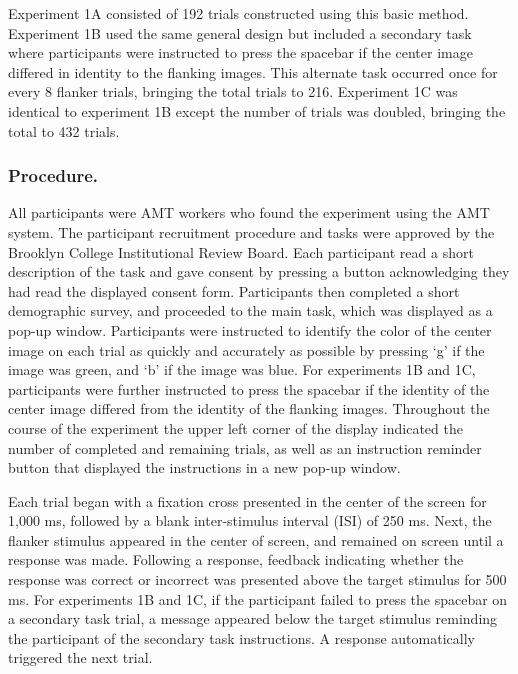 \documentclass[]{DissertateCUNY}
\begin{document}
Experiment 1A consisted of 192 trials constructed using this basic
method. Experiment 1B used the same general design but included a
secondary task where participants were instructed to press the spacebar
if the center image differed in identity to the flanking images. This
alternate task occurred once for every 8 flanker trials, bringing the
total trials to 216. Experiment 1C was identical to experiment 1B except
the number of trials was doubled, bringing the total to 432 trials.

\hypertarget{procedure.}{%
\subsubsection{Procedure.}\label{procedure.}}

All participants were AMT workers who found the experiment using the AMT
system. The participant recruitment procedure and tasks were approved by
the Brooklyn College Institutional Review Board. Each participant read a
short description of the task and gave consent by pressing a button
acknowledging they had read the displayed consent form. Participants
then completed a short demographic survey, and proceeded to the main
task, which was displayed as a pop-up window. Participants were
instructed to identify the color of the center image on each trial as
quickly and accurately as possible by pressing `g' if the image was
green, and `b' if the image was blue. For experiments 1B and 1C,
participants were further instructed to press the spacebar if the
identity of the center image differed from the identity of the flanking
images. Throughout the course of the experiment the upper left corner of
the display indicated the number of completed and remaining trials, as
well as an instruction reminder button that displayed the instructions
in a new pop-up window.

Each trial began with a fixation cross presented in the center of the
screen for 1,000 ms, followed by a blank inter-stimulus interval (ISI)
of 250 ms. Next, the flanker stimulus appeared in the center of screen,
and remained on screen until a response was made. Following a response,
feedback indicating whether the response was correct or incorrect was
presented above the target stimulus for 500 ms. For experiments 1B and
1C, if the participant failed to press the spacebar on a secondary task
trial, a message appeared below the target stimulus reminding the
participant of the secondary task instructions. A response automatically
triggered the next trial.
\end{document}
